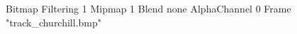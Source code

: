 {Bitmap
	{Filtering 1}
	{Mipmap 1}
	{Blend none}
	{AlphaChannel 0}
	{Frame "track_churchill.bmp"}
}
